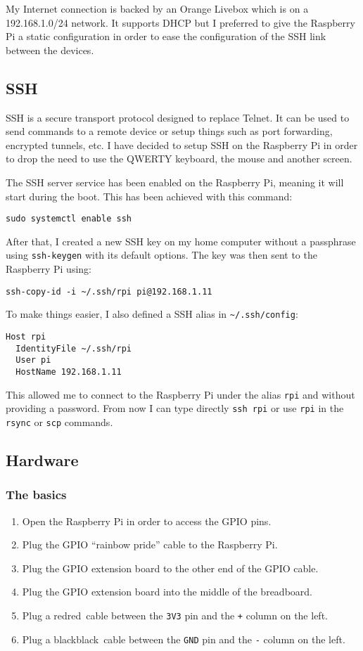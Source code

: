 \documentclass[11pt,a4paper]{article}
\newcommand{\rpi}{Raspberry Pi\xspace}
\newcommand{\plugcolumn}[4]{Plug a {#1\def\temp{#1}\ifx\temp\empty\else\ \fi}cable between the \texttt{#2} pin and the \texttt{#3} column on the #4.}
\begin{document}
My Internet connection is backed by an Orange Livebox which is on a 192.168.1.0/24 network. It supports DHCP but I preferred to give the \rpi a static configuration in order to ease the configuration of the SSH link between the devices.

\subsection{SSH}
SSH is a secure transport protocol designed to replace Telnet. It can be used to send commands to a remote device or setup things such as port forwarding, encrypted tunnels, etc. I have decided to setup SSH on the \rpi in order to drop the need to use the QWERTY keyboard, the mouse and another screen.

The SSH server service has been enabled on the \rpi, meaning it will start during the boot. This has been achieved with this command:
\begin{verbatim}
sudo systemctl enable ssh
\end{verbatim}

After that, I created a new SSH key on my home computer without a passphrase using \texttt{ssh-keygen} with its default options. The key was then sent to the \rpi using:
\begin{verbatim}
ssh-copy-id -i ~/.ssh/rpi pi@192.168.1.11
\end{verbatim}

To make things easier, I also defined a SSH alias in \verb|~/.ssh/config|:
\begin{verbatim}
Host rpi
  IdentityFile ~/.ssh/rpi
  User pi
  HostName 192.168.1.11
\end{verbatim}

This allowed me to connect to the \rpi under the alias \texttt{rpi} and without providing a password. From now I can type directly \texttt{ssh rpi} or use \texttt{rpi} in the \texttt{rsync} or \texttt{scp} commands.

\subsection{Hardware}

\subsubsection{The basics}
\begin{enumerate}
  \item	Open the \rpi in order to access the GPIO pins.
  \item	Plug the GPIO ``rainbow pride'' cable to the \rpi.
  \item	Plug the GPIO extension board to the other end of the GPIO cable.
  \item	Plug the GPIO extension board into the middle of the breadboard.
  \item	\plugcolumn{red}{3V3}{+}{left}
  \item	\plugcolumn{black}{GND}{-}{left}
\end{enumerate}
\end{document}
